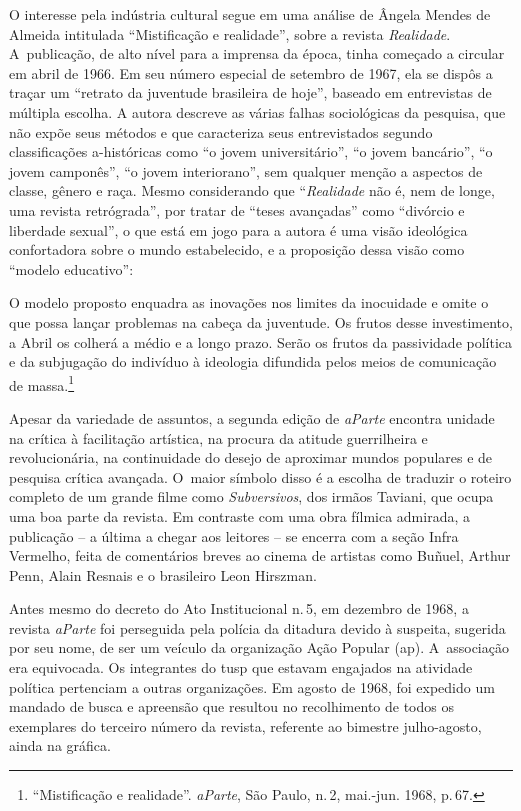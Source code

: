 O interesse pela indústria cultural segue em uma análise de Ângela Mendes
de Almeida intitulada “Mistificação e realidade”, sobre a revista
{\it Realidade}. A~publicação, de alto nível para a imprensa da época,
tinha começado a circular em abril de 1966. Em seu número especial de
setembro de 1967, ela se dispôs a traçar um “retrato da juventude
brasileira de hoje”, baseado em entrevistas de múltipla escolha. A
autora descreve as várias falhas sociológicas da pesquisa, que não expõe
seus métodos e que caracteriza seus entrevistados segundo classificações
a-históricas como “o jovem universitário”, “o jovem bancário”, “o jovem
camponês”, “o jovem interiorano”, sem qualquer menção a aspectos de
classe, gênero e raça. Mesmo considerando que “{\it Realidade} não é, nem
de longe, uma revista retrógrada”, por tratar de “teses avançadas” como
“divórcio e liberdade sexual”, o que está em jogo para a autora é uma
visão ideológica confortadora sobre o mundo estabelecido, e a proposição
dessa visão como “modelo educativo”:

\startblockquote
O modelo proposto enquadra as inovações nos limites da inocuidade e
omite o que possa lançar problemas na cabeça da juventude. Os frutos
desse investimento, a Abril os colherá a médio e a longo prazo. Serão os
frutos da passividade política e da subjugação do indivíduo à ideologia
difundida pelos meios de comunicação de massa.\footnote{“Mistificação e
  realidade”. {\it aParte}, São Paulo, n.\,2, mai.-jun. 1968, p.\,67.}
\stopblockquote

Apesar da variedade de assuntos, a segunda edição de {\it aParte}
encontra unidade na crítica à facilitação artística, na procura da
atitude guerrilheira e revolucionária, na continuidade do desejo de
aproximar mundos populares e de pesquisa crítica avançada. O~maior
símbolo disso é a escolha de traduzir o roteiro completo de um grande
filme como {\it Subversivos}, dos irmãos Taviani, que ocupa uma boa
parte da revista. Em contraste com uma obra fílmica admirada, a
publicação -- a última a chegar aos leitores -- se encerra com
a seção Infra Vermelho, feita de comentários breves ao cinema
de artistas como Buñuel, Arthur Penn, Alain Resnais e o
brasileiro Leon Hirszman.


Antes mesmo do decreto do Ato Institucional n.\,5, em dezembro de
1968, a revista {\it aParte} foi perseguida pela polícia da ditadura
devido à suspeita, sugerida por seu nome, de ser um veículo da
organização Ação Popular ({\sc ap}). A~associação era equivocada. Os
integrantes do {\sc tusp} que estavam engajados na atividade política
pertenciam a outras organizações. Em agosto de 1968, foi expedido um
mandado de busca e apreensão que resultou no recolhimento de todos os
exemplares do terceiro número da revista, referente ao bimestre
julho-agosto, ainda na gráfica.

